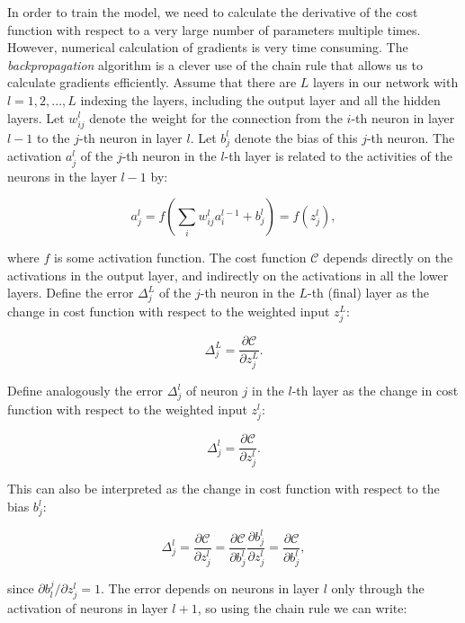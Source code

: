 In order to train the model, we need to calculate the derivative of the cost
function with respect to a very large number of parameters multiple times. However,
numerical calculation of gradients is very time consuming. The \textit{backpropagation}
algorithm is a clever use of the chain rule that allows us to calculate gradients efficiently.
Assume that there are $L$ layers in our network with $l = 1,2,...,L$ indexing the layers, including
the output layer and all the hidden layers.
Let $w_{ij}^l$ denote the weight for the connection
from the $i$-th neuron in layer $l - 1$ to the $j$-th neuron in layer $l$. Let $b_{j}^l$ denote the bias of this $j$-th neuron.
The activation $a_{j}^l$ of the $j$-th neuron in the $l$-th layer is related to the activities of the neurons in the layer $l - 1$ by:

\begin{equation}
 a_{j}^l = f \left( \sum_i w_{ij}^l a_i^{l-1} + b_j^l \right) = f \left( z_j^l \right) ,
\end{equation}

where $f$ is some activation function.
The cost function $\mathcal{C}$ depends directly on the activations in the output layer, and indirectly on the activations
in all the lower layers.
Define the error $\Delta_j^L$ of the $j$-th neuron in the $L$-th (final) layer as the change in cost function
with respect to the weighted input $z_j^L$:

\begin{equation}
 \Delta_j^L = \frac{\partial \mathcal{C}}{\partial z_j^L} .
\end{equation}

Define analogously the error $\Delta_j^l$ of neuron $j$ in the $l$-th layer as the change in cost function with respect to the weighted input
$z_j^l$:

\begin{equation}
 \Delta_j^l = \frac{\partial \mathcal{C}}{\partial z_j^l} .
\end{equation}

This can also be interpreted as the change in cost function with respect to the bias $b_j^l$:

\begin{equation}
 \Delta_j^l = \frac{\partial \mathcal{C}}{\partial z_j^l} = \frac{\partial \mathcal{C}}{\partial b_j^l} 
\frac{\partial b_j^l}{\partial z_j^l} = \frac{\partial \mathcal{C}}{\partial b_j^l} ,
\end{equation}

since $ \partial b_l^j / \partial z_j^l = 1$.
The error depends on neurons in layer $l$ only through the 
activation of neurons in layer $l + 1$, so using the chain rule we can write:

